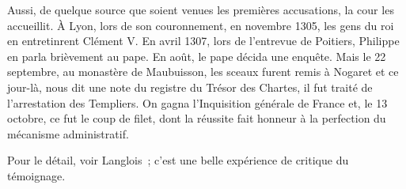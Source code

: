 \documentclass[french,twoside]{book} %
\begin{document}
\label{p54} Aussi, de quelque source que soient venues les premières accusations, la cour les accueillit. À Lyon, lors de son couronnement, en novembre 1305, les gens du roi en entretinrent Clément V. En avril 1307, lors de l’entrevue de Poitiers, Philippe en parla brièvement au pape. En août, le pape décida une enquête. Mais le 22 septembre, au monastère de Maubuisson, les sceaux furent remis à Nogaret et ce jour-là, nous dit une note du registre du Trésor des Chartes, il fut traité de l’arrestation des Templiers. On gagna l’Inquisition générale de France et, le 13 octobre, ce fut le coup de filet, dont la réussite fait honneur à la perfection du mécanisme administratif.\par
Pour le détail, voir Langlois ; c’est une belle expérience de critique du témoignage.\par
\end{document}
